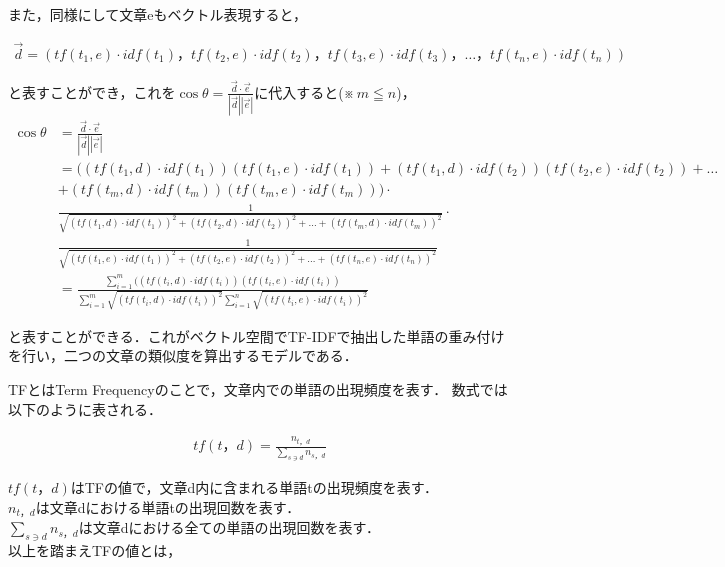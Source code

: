また，同様にして文章eもベクトル表現すると，

\begin{align}
\vec{d} = (tf(t_{1},e) \cdot idf(t_{1})，tf(t_{2},e) \cdot idf(t_{2})，tf(t_{3},e) \cdot idf(t_{3})， \ldots ，tf(t_{n},e) \cdot idf(t_{n})) \nonumber
\end{align}

と表すことができ，これを$ \cos \theta = \frac{\vec{d} \cdot \vec{e}}{|\vec{d}| |\vec{e}|} $に代入すると(※\,$ m \leqq n $)，
\begin{align}
\cos \theta &= \frac{\vec{d} \cdot \vec{e}}{|\vec{d}| |\vec{e}|} \nonumber \\
            &= ((tf(t_{1},d) \cdot idf(t_{1}))(tf(t_{1},e) \cdot idf(t_{1})) + (tf(t_{1},d) \cdot idf(t_{2}))(tf(t_{2},e) \cdot idf(t_{2})) + \ldots \nonumber \\
            &+ (tf(t_{m},d) \cdot idf(t_{m}))(tf(t_{m},e) \cdot idf(t_{m}))) \cdot \nonumber \\
            &\frac{1}{\sqrt{(tf(t_{1},d) \cdot idf(t_{1}))^2 + (tf(t_{2},d) \cdot idf(t_{2}))^2 + \ldots + (tf(t_{m},d) \cdot idf(t_{m}))^2}} \cdot \nonumber \\[2mm]
            &\frac{1}{\sqrt{(tf(t_{1},e) \cdot idf(t_{1}))^2 + (tf(t_{2},e) \cdot idf(t_{2}))^2 + \ldots + (tf(t_{n},e) \cdot idf(t_{n}))^2}} \nonumber \\[2mm]
            &= \frac{ \sum_{i=1}^{m} ((tf(t_{i},d) \cdot idf(t_{i}))(tf(t_{i},e) \cdot idf(t_{i}))}{\sum_{i=1}^{m} \sqrt{(tf(t_{i},d) \cdot idf(t_{i}))^2} \sum_{i=1}^{n} \sqrt{(tf(t_{i},e) \cdot idf(t_{i}))^2}} \nonumber
\end{align}

と表すことができる．これがベクトル空間でTF-IDFで抽出した単語の重み付けを行い，二つの文章の類似度を算出するモデルである．


\label{tech:tfidf}
TFとはTerm Frequencyのことで，文章内での単語の出現頻度を表す．
数式では以下のように表される．

\begin{align}
tf(t，d) = \frac{n_{t，d}}{\sum_{s \ni{d}}n_{s，d}} \nonumber
\end{align}

$ tf(t，d) $はTFの値で，文章d内に含まれる単語tの出現頻度を表す．\\
$ n_{t，d} $は文章dにおける単語tの出現回数を表す．\\
$ \sum_{s \ni{d}}n_{s，d} $は文章dにおける全ての単語の出現回数を表す．\\
以上を踏まえTFの値とは，

